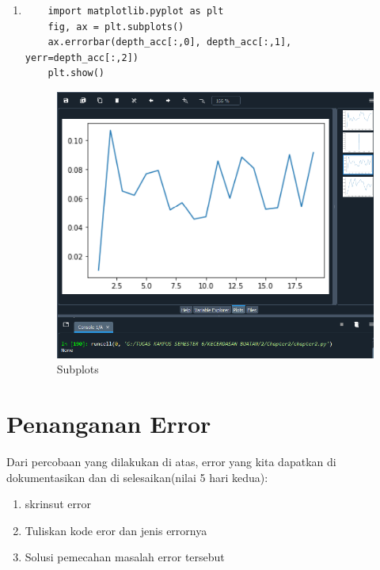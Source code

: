 \begin{enumerate}
	\item
	      \begin{verbatim}
	import matplotlib.pyplot as plt
	fig, ax = plt.subplots()
	ax.errorbar(depth_acc[:,0], depth_acc[:,1], yerr=depth_acc[:,2])
	plt.show()
\end{verbatim}
	      \begin{figure}[ht]
		      \centerline{\includegraphics[scale=0.6]{figures/Chapter2n.png}}
		      \caption{Subplots}
		      \label{Subplots}
	      \end{figure}

\end{enumerate}

\newpage

\section{Penanganan Error}
Dari percobaan yang dilakukan di atas, error yang kita dapatkan di dokumentasikan dan di selesaikan(nilai 5 hari kedua):

\begin{enumerate}
	\item
	      skrinsut error
	\item
	      Tuliskan kode eror dan jenis errornya
	\item
	      Solusi pemecahan masalah error tersebut

\end{enumerate}

